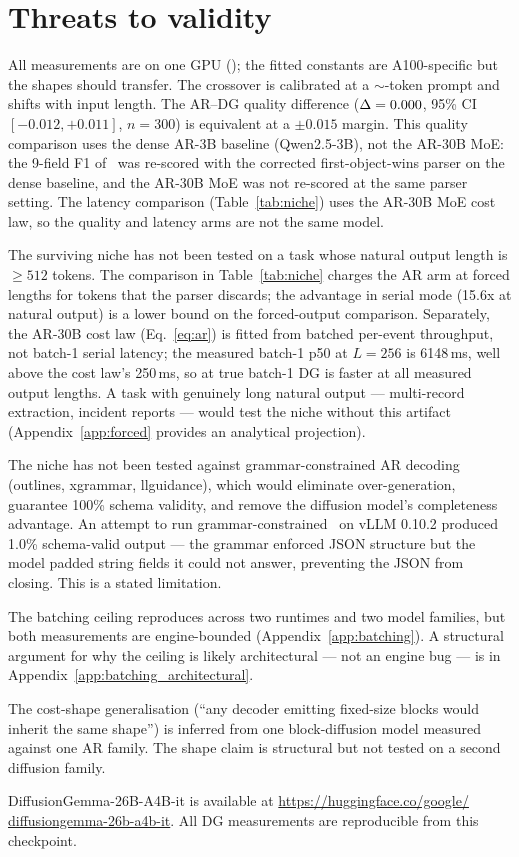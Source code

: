 \section{Threats to validity}
\label{sec:threats}

All measurements are on one GPU (\gpuModel{}); the fitted constants are
A100-specific but the shapes should transfer. The crossover is
calibrated at a $\sim$-token prompt and shifts with input
length. The AR--DG quality difference ($\Delta = 0.000$, 95\% CI
$[-0.012, +0.011]$, $n = 300$) is equivalent at a $\pm 0.015$ margin.
This quality comparison uses the dense AR-3B baseline
(Qwen2.5-3B), not the AR-30B MoE: the 9-field F1 of
\arThreeBFnine\ was re-scored with the corrected first-object-wins parser
on the dense baseline, and the AR-30B MoE was not re-scored at the same
parser setting. The latency comparison (Table~\ref{tab:niche}) uses the
AR-30B MoE cost law, so the quality and latency arms are not the same
model.

The surviving niche has not been tested on a task whose natural output
length is $\geq 512$ tokens. The comparison in
Table~\ref{tab:niche} charges the AR arm at forced lengths for tokens that the parser
discards; the advantage in serial mode (15.6x at natural output) is a lower bound on the forced-output
comparison. Separately, the AR-30B cost law (Eq.~\ref{eq:ar}) is fitted from
batched per-event throughput, not batch-1 serial latency; the measured
batch-1 p50 at $L{=}256$ is 6148\,ms, well above the cost law's 250\,ms, so
at true batch-1 DG is faster at all measured output lengths. A task with
genuinely long natural output --- multi-record extraction, incident
reports --- would test the niche without this artifact
(Appendix~\ref{app:forced} provides an analytical projection).

The niche has not been tested against grammar-constrained AR decoding
(outlines, xgrammar, llguidance), which would eliminate over-generation,
guarantee 100\% schema validity, and remove the diffusion model's
completeness advantage. An attempt to run grammar-constrained
\ARoneb\ on vLLM 0.10.2 produced 1.0\% schema-valid output --- the
grammar enforced JSON structure but the model padded string fields it
could not answer, preventing the JSON from closing. This is a stated
limitation.

The batching ceiling reproduces across two runtimes and two model
families, but both measurements are engine-bounded
(Appendix~\ref{app:batching}). A structural argument for why the ceiling
is likely architectural --- not an engine bug --- is in
Appendix~\ref{app:batching_architectural}.

The cost-shape generalisation (``any decoder emitting fixed-size blocks
would inherit the same shape'') is inferred from one block-diffusion
model measured against one AR family. The shape claim is structural but
not tested on a second diffusion family.

DiffusionGemma-26B-A4B-it is available at
\url{https://huggingface.co/google/}\\\url{diffusiongemma-26b-a4b-it}.
All DG measurements are reproducible from this checkpoint.
